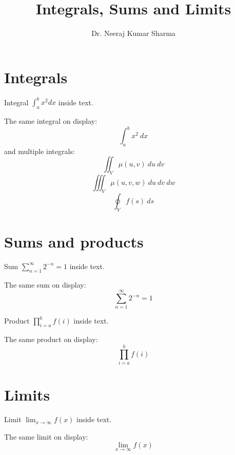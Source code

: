 \documentclass{article}
\title{Integrals, Sums and Limits}
\author{Dr. Neeraj Kumar Sharma}
\begin{document}
\maketitle

\section{Integrals}
Integral $\int^b_a x^2 dx$ inside text.

The same integral on display:
\[\int^b_a x^2 \ dx\]
and multiple integrals:
\[\iint_V \mu(u,v) \ du \ dv\]
\[\iiint_V \mu(u,v,w)\ du \ dv \ dw\]
\[\oint_V f(s) \ ds\]

\section{Sums and products}
Sum $\sum^{\infty}_{n=1} 2^{-n}=1$ inside text.

The same sum on display:
\[\sum_{n=1}^{\infty} 2^{-n}=1\]

Product $\prod^b_{i=a} f(i)$ inside text.

The same product on display:
\[\prod^b_{i=a}f(i)\]

\section{Limits}
Limit $\lim_{x \to \infty}f(x)$ inside text.

The same limit on display:
\[\lim_{x \to \infty}f(x)\]
\end{document}
